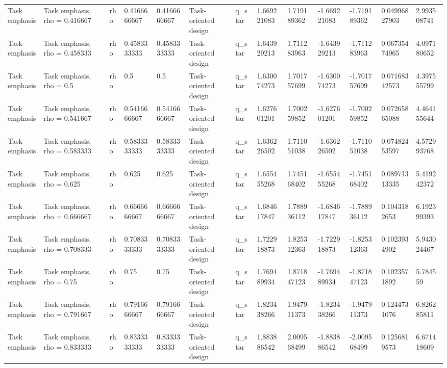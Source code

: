 \begin{tabular}{@{}lllllllllllll@{}}
Task emphasis & Task emphasis, rho = 0.416667 & rho & 0.4166666667 & 0.4166666667 & Task-oriented design & q\_star & 1.669221083 & 1.719189362 & -1.669221083 & -1.719189362 & 0.04996827903 & 2.993508741 \\
Task emphasis & Task emphasis, rho = 0.458333 & rho & 0.4583333333 & 0.4583333333 & Task-oriented design & q\_star & 1.643929213 & 1.711283963 & -1.643929213 & -1.711283963 & 0.06735474965 & 4.097180652 \\
Task emphasis & Task emphasis, rho = 0.5 & rho & 0.5 & 0.5 & Task-oriented design & q\_star & 1.630074273 & 1.701757699 & -1.630074273 & -1.701757699 & 0.07168342573 & 4.397555799 \\
Task emphasis & Task emphasis, rho = 0.541667 & rho & 0.5416666667 & 0.5416666667 & Task-oriented design & q\_star & 1.627601201 & 1.700259852 & -1.627601201 & -1.700259852 & 0.07265865088 & 4.464155644 \\
Task emphasis & Task emphasis, rho = 0.583333 & rho & 0.5833333333 & 0.5833333333 & Task-oriented design & q\_star & 1.636226502 & 1.711051038 & -1.636226502 & -1.711051038 & 0.07482453597 & 4.572993768 \\
Task emphasis & Task emphasis, rho = 0.625 & rho & 0.625 & 0.625 & Task-oriented design & q\_star & 1.655455268 & 1.745168402 & -1.655455268 & -1.745168402 & 0.08971313335 & 5.419242372 \\
Task emphasis & Task emphasis, rho = 0.666667 & rho & 0.6666666667 & 0.6666666667 & Task-oriented design & q\_star & 1.684617847 & 1.788936112 & -1.684617847 & -1.788936112 & 0.1043182653 & 6.192399393 \\
Task emphasis & Task emphasis, rho = 0.708333 & rho & 0.7083333333 & 0.7083333333 & Task-oriented design & q\_star & 1.722918873 & 1.825312363 & -1.722918873 & -1.825312363 & 0.1023934902 & 5.943024467 \\
Task emphasis & Task emphasis, rho = 0.75 & rho & 0.75 & 0.75 & Task-oriented design & q\_star & 1.769489934 & 1.871847123 & -1.769489934 & -1.871847123 & 0.1023571892 & 5.784559 \\
Task emphasis & Task emphasis, rho = 0.791667 & rho & 0.7916666667 & 0.7916666667 & Task-oriented design & q\_star & 1.823438266 & 1.947911373 & -1.823438266 & -1.947911373 & 0.1244731076 & 6.826285811 \\
Task emphasis & Task emphasis, rho = 0.833333 & rho & 0.8333333333 & 0.8333333333 & Task-oriented design & q\_star & 1.883886542 & 2.009568499 & -1.883886542 & -2.009568499 & 0.1256819573 & 6.671418609 \\

\end{tabular}
